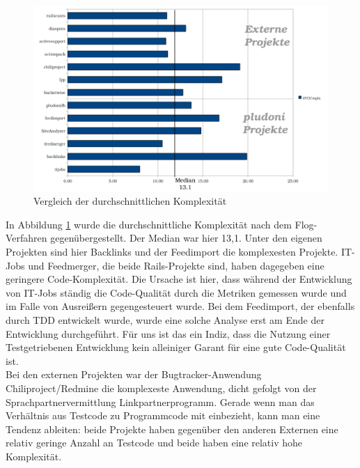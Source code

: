 \begin{figure}[htbp]
 \centering
 \includegraphics[width=\linewidth]{./diagrams/cmp-complex.pdf}
 \caption{Vergleich der durchschnittlichen Komplexität}
 \label{fig:cpm-complex}
\end{figure}
In Abbildung \ref{fig:cpm-complex} wurde die durchschnittliche Komplexität nach dem Flog-Verfahren gegenübergestellt. Der Median war hier 13,1. Unter den eigenen Projekten sind hier Backlinks und der Feedimport die komplexesten Projekte. IT-Jobs und Feedmerger, die beide Rails-Projekte sind, haben dagegeben eine geringere Code-Komplexität. Die Ursache ist hier, dass während der Entwicklung von IT-Jobs ständig die Code-Qualität durch die Metriken gemessen wurde und im Falle von Ausreißern gegengesteuert wurde. Bei dem Feedimport, der ebenfalls durch TDD entwickelt wurde, wurde eine solche Analyse erst am Ende der Entwicklung durchgeführt. Für uns ist das ein Indiz, dass die Nutzung einer Testgetriebenen Entwicklung kein alleiniger Garant für eine gute Code-Qualität ist.\\
Bei den externen Projekten war der Bugtracker-Anwendung Chiliproject/Redmine die komplexeste Anwendung, dicht gefolgt von der Sprachpartnervermittlung Linkpartnerprogramm. Gerade wenn man das Verhältnis aus Testcode zu Programmcode mit einbezieht, kann man eine Tendenz ableiten: beide Projekte haben gegenüber den anderen Externen eine relativ geringe Anzahl an Testcode und beide haben eine relativ hohe Komplexität.


